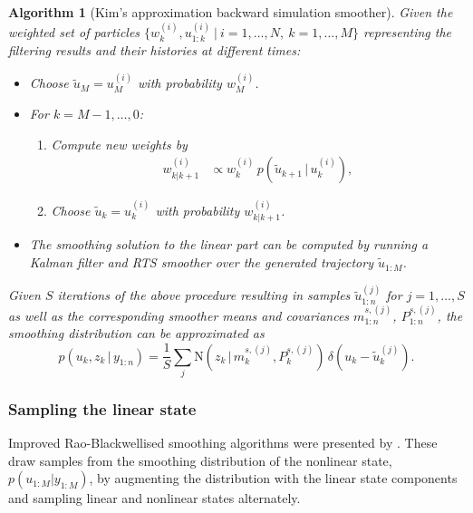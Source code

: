 \documentclass[twocolumn]{autart}    %
\newtheorem{algo}{Algorithm}[section]
\begin{document}
\begin{algo}[Kim's approximation backward simulation smoother]
  \label{alg:rbbssmooth}
  Given the weighted set of particles $\{ w_k^{(i)}, u_{1:k}^{(i)} ~|~
  i=1,\ldots,N,~k=1,\ldots,M \}$ representing the filtering results
  and their histories at different times:
\begin{itemize}
\item Choose $\tilde{u}_M = u_M^{(i)}$ with probability $w^{(i)}_{M}$.
\item For $k=M-1,\ldots,0$:
\begin{enumerate}
  \item Compute new weights by
    \begin{equation}
      \begin{split}
        w^{(i)}_{k|k+1} &\propto
        w_k^{(i)} \,
        p(\tilde{u}_{k+1}\,|\,u_{k}^{(i)}),
     \end{split}
    \end{equation}

  \item Choose $\tilde{u}_k = u_k^{(i)}$ with probability
    $w^{(i)}_{k|k+1}$.
  \end{enumerate}
\item The smoothing solution to the linear part can be computed by running a Kalman filter and RTS smoother over the generated trajectory $\tilde{u}_{1:M}$.
\end{itemize}
%
Given $S$ iterations of the above procedure resulting in samples $\tilde{u}_{1:n}^{(j)}$ for $j=1,\ldots,S$ as well as the corresponding smoother means and covariances $m^{s,(j)}_{1:n}$, $P^{s,(j)}_{1:n}$, the smoothing distribution can be approximated as
%
\begin{equation}
  p(u_k,z_k\,|\,y_{1:n})
  = \frac{1}{S} \sum_j \mathrm{N}(z_k\,|\,m_k^{s,(j)},P_k^{s,(j)}) \,
  \delta(u_k - \tilde{u}_k^{(j)}).
\nonumber
\end{equation}
\end{algo}


\subsubsection{Sampling the linear state}
%
Improved Rao-Blackwellised smoothing algorithms were presented by \cite{Fong+Godsill+Doucet+West:2002,Lindsten+Schon:2011}. These draw samples from the smoothing distribution of the nonlinear state, $p(u_{1:M} | y_{1:M})$, by augmenting the distribution with the linear state components and sampling linear and nonlinear states alternately.
\end{document}
